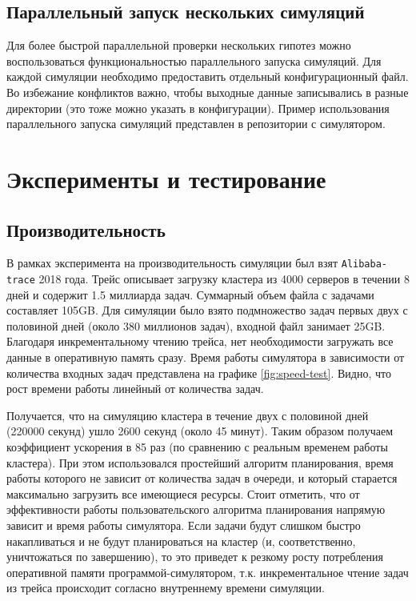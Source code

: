 \subsection{Параллельный запуск нескольких симуляций}

Для более быстрой параллельной проверки нескольких гипотез можно воспользоваться функциональностью параллельного запуска симуляций. Для каждой симуляции необходимо предоставить отдельный конфигурационный файл. Во избежание конфликтов важно, чтобы выходные данные записывались в разные директории (это тоже можно указать в конфигурации). Пример использования параллельного запуска симуляций представлен в репозитории с симулятором\cite{dslab-cluster-scheduling-parallel-launching}.


\section{Эксперименты и тестирование}\label{sec:experiments}

\subsection{Производительность}\label{sec:experiments-speed}

В рамках эксперимента на производительность симуляции был взят \texttt{Alibaba-trace} 2018 года\cite{alibaba-clusterdata}. Трейс описывает загрузку кластера из 4000 серверов в течении 8 дней и содержит 1.5 миллиарда задач. Суммарный объем файла с задачами составляет 105GB. Для симуляции было взято подмножество задач первых двух с половиной дней (около 380 миллионов задач), входной файл занимает 25GB. Благодаря инкрементальному чтению трейса, нет необходимости загружать все данные в оперативную память сразу. Время работы симулятора в зависимости от количества входных задач представлена на графике \ref{fig:speed-test}. 
Видно, что рост времени работы линейный от количества задач.

Получается, что на симуляцию кластера в течение двух с половиной дней (220000 секунд) ушло 2600 секунд (около 45 минут). Таким образом получаем коэффициент ускорения в 85 раз (по сравнению с реальным временем работы кластера). При этом использовался простейший алгоритм планирования, время работы которого не зависит от количества задач в очереди, и который старается максимально загрузить все имеющиеся ресурсы. Стоит отметить, что от эффективности работы пользовательского алгоритма планирования напрямую зависит и время работы симулятора. Если задачи будут слишком быстро накапливаться и не будут планироваться на кластер (и, соответственно, уничтожаться по завершению), то это приведет к резкому росту потребления оперативной памяти программой-симулятором, т.к. инкрементальное чтение задач из трейса происходит согласно внутреннему времени симуляции.

